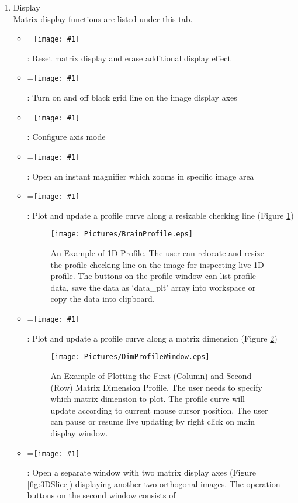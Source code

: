 \documentclass{article}%
\newcommand{\vcenteredinclude}[1]{
\begingroup
\setbox0=\hbox{\texttt{[image: \#1]}}
\parbox{\wd0}{\box0}\endgroup}
\begin{document}
	\begin{enumerate}

	\item Display \\
	
	Matrix display functions are listed under this tab. 
	
	\begin{itemize}
		\item \vcenteredinclude{Pictures/Release.eps} : Reset matrix display and erase additional display effect
		\item \vcenteredinclude{Pictures/Grid.eps} : Turn on and off black grid line on the image display axes
		\item \vcenteredinclude{Pictures/Axis.eps} : Configure axis mode
		\item \vcenteredinclude{Pictures/Magnifier.eps} : Open an instant magnifier which zooms in specific image area
		\item \vcenteredinclude{Pictures/LineProfile.eps} : Plot and update a profile curve along a resizable checking line (Figure \ref{fig:BrainProfile})
		
		\begin{figure}[htbp]
			\centering
				\texttt{[image: Pictures/BrainProfile.eps]}
			\caption{An Example of 1D Profile. The user can relocate and resize the profile checking line on the image for inspecting live 1D profile. The buttons on the profile window 
							 can list profile data, save the data as `data\_plt' array into workspace or copy the data into clipboard.}
			\label{fig:BrainProfile}
		\end{figure}	
		
		
		\item \vcenteredinclude{Pictures/DimProfile.eps} : Plot and update a profile curve along a matrix dimension (Figure \ref{fig:DimProfileWindow})
		
			\begin{figure}[htbp]
			\centering
				\texttt{[image: Pictures/DimProfileWindow.eps]}
			\caption{An Example of Plotting the First (Column) and Second (Row) Matrix Dimension Profile. The user needs to specify which matrix dimension to plot. The profile curve will update according to current mouse cursor position. The user can pause or resume live updating by right click on main display window.}
			\label{fig:DimProfileWindow}
		\end{figure}	
		
		\item \vcenteredinclude{Pictures/3DSlicer.eps} : Open a separate window with two matrix display axes (Figure \ref{fig:3DSlice}) displaying another two orthogonal images. The operation buttons on the second window consists of 


\end{itemize}
\end{enumerate}
\end{document}
